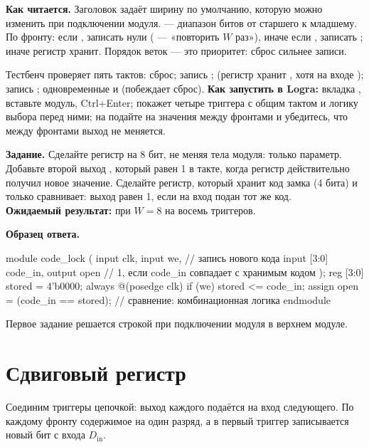 \textbf{Как читается.} Заголовок  задаёт ширину по
умолчанию, которую можно изменить при подключении модуля. \code{[W-1:0]} ---
диапазон битов от старшего к младшему. По фронту: если , записать
нули ( --- «повторить  $W$ раз»), иначе если
, записать ; иначе регистр хранит. Порядок веток --- это
приоритет: сброс сильнее записи.

Тестбенч  проверяет пять тактов: сброс; запись ;
 (регистр хранит , хотя на входе ); запись ;
одновременные  и  (побеждает сброс). \textbf{Как запустить
в Logra:} вкладка , вставьте модуль, Ctrl+Enter;  покажет
четыре триггера с общим тактом и логику выбора перед ними; на 
подайте на  значения  между фронтами и убедитесь, что
между фронтами выход не меняется.

\begin{diybox}
\textbf{Задание.}  Сделайте регистр на 8 бит, не меняя тела модуля:
только параметр.  Добавьте второй выход , который равен 1
в такте, когда регистр действительно получил новое значение.  Сделайте
регистр, который хранит код замка (4 бита) и только сравнивает: выход
 равен 1, если на вход подан тот же код.\\
\textbf{Ожидаемый результат:} при $W=8$ на  восемь триггеров.
\end{diybox}

\textbf{Образец ответа.}
\begin{vcode}
module code_lock (
    input        clk,
    input        we,         // запись нового кода
    input  [3:0] code_in,
    output       open        // 1, если code_in совпадает с хранимым кодом
);
    reg [3:0] stored = 4'b0000;
    always @(posedge clk) if (we) stored <= code_in;
    assign open = (code_in == stored);   // сравнение: комбинационная логика
endmodule
\end{vcode}
Первое задание решается строкой  при
подключении модуля в верхнем модуле.

\section{Сдвиговый регистр}

Соединим триггеры цепочкой: выход каждого подаётся на вход следующего. По
каждому фронту содержимое  на один разряд, а в первый
триггер записывается новый бит с входа $D_\text{in}$.

